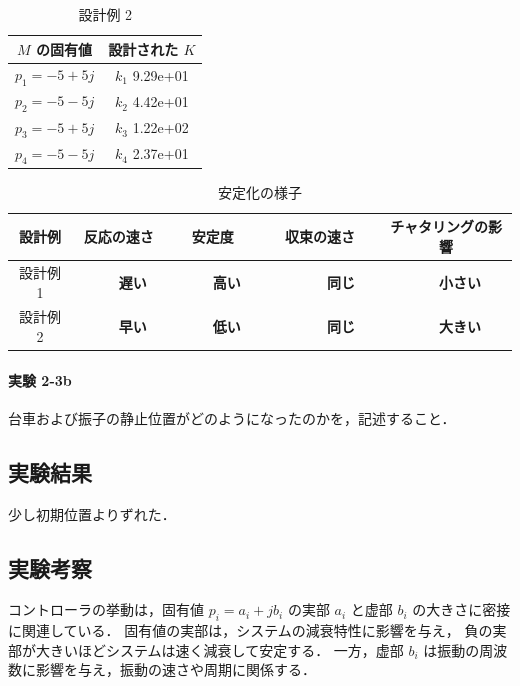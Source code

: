 \begin{table}[h]
  \centering
  \caption{設計例 2}
  \label{tab:design_example_2}
  \begin{tabular}{|c|c|}
    \hline
    \( M \) の固有値    & 設計された \( K \)  \\
    \hline
    \( p_1 = -5 + 5j \) & \( k_1 \)  9.29e+01 \\
    \( p_2 = -5 - 5j \) & \( k_2 \) 4.42e+01  \\
    \( p_3 = -5 + 5j \) & \( k_3 \)  1.22e+02 \\
    \( p_4 = -5 - 5j \) & \( k_4 \)  2.37e+01 \\
    \hline
  \end{tabular}
\end{table}

\begin{table}[h]
  \centering
  \caption{安定化の様子}
  \label{tab:stabilization_observation}
  \begin{tabular}{|c|c|c|c|c|}
    \hline
    設計例   & 反応の速さ                    & 安定度                        & 収束の速さ                        & チャタリングの影響              \\
    \hline
    設計例 1 & {\large\textbf{　　遅い　　}} & {\large\textbf{　　高い　　}} & {\large\textbf{　　　同じ　　　}} & {\large\textbf{　　小さい　　}} \\
    設計例 2 & {\large\textbf{　　早い　　}} & {\large\textbf{　　低い　　}} & {\large\textbf{　　　同じ　　　}} & {\large\textbf{　　大きい　　}} \\
    \hline
  \end{tabular}
\end{table}

\paragraph{実験 2-3b}
台車および振子の静止位置がどのようになったのかを，記述すること．

\subsection{実験結果}
少し初期位置よりずれた．

\subsection{実験考察}
コントローラの挙動は，固有値 \( p_i = a_i + jb_i \) の実部 \( a_i \) と虚部 \( b_i \) 
の大きさに密接に関連している．
固有値の実部は，システムの減衰特性に影響を与え，
負の実部が大きいほどシステムは速く減衰して安定する．
一方，虚部 \( b_i \) は振動の周波数に影響を与え，振動の速さや周期に関係する．

